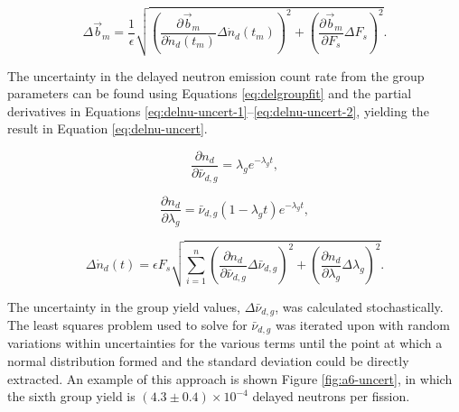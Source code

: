\documentclass{style/nseJournal}
\begin{document}
\begin{equation}
\Delta \vec{b}_m = \frac{1}{\epsilon} \sqrt{ \left( \frac{\partial \vec{b}_m}{\partial \dot{n}_d(t_m)} \Delta \dot{n}_d(t_m) \right)^2 + \left( \frac{\partial \vec{b}_m}{\partial F_s} \Delta F_s \right)^2 } .
\label{eq:ORIb-uncert-4}
\end{equation}

The uncertainty in the delayed neutron emission count rate from the group parameters can be found using Equations \eqref{eq:delgroupfit} and the partial derivatives in Equations \eqref{eq:delnu-uncert-1}--\eqref{eq:delnu-uncert-2}, yielding the result in Equation \eqref{eq:delnu-uncert}.

\begin{equation}
\frac{\partial n_d}{\partial\bar{\nu}_{d, g}} = \lambda_g e^{-\lambda_g t} ,
\label{eq:delnu-uncert-1}
\end{equation}

\begin{equation}
\frac{\partial n_d}{\partial \lambda_g} = \bar{\nu}_{d, g} (1-\lambda_g t) e^{-\lambda_g t} ,
\label{eq:delnu-uncert-2}
\end{equation}

\begin{equation}
\Delta \dot{n}_d(t) = \epsilon F_s \sqrt{ \sum_{i=1}^n \left( \frac{\partial n_d}{\partial\bar{\nu}_{d, g}} \Delta\bar{\nu}_{d, g} \right)^2 + \left( \frac{\partial n_d}{\partial \lambda_g} \Delta \lambda_g \right)^2 }
\label{eq:delnu-uncert}.
\end{equation}


The uncertainty in the group yield values, $\Delta\bar{\nu}_{d, g}$, was calculated stochastically. The least squares problem used to solve for $\bar{\nu}_{d, g}$ was iterated upon with random variations within uncertainties for the various terms until the point at which a normal distribution formed and the standard deviation could be directly extracted.
An example of this approach is shown Figure \ref{fig:a6-uncert}, in which the sixth group yield is $(4.3 \pm 0.4) \times 10^{-4}$ delayed neutrons per fission.
\end{document}
